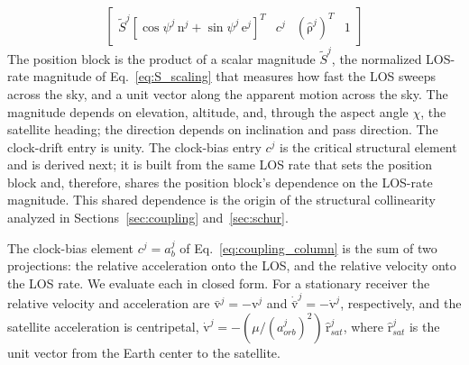 \documentclass[letterpaper,times]{IONconf-v2}
\theoremstyle{plain}
\theoremstyle{remark}
\renewcommand{\vec}[1]{{\boldsymbol{\mathrm{#1}}}}
\begin{document}
%
\begin{equation}\label{eq:8state_row}
\begin{bmatrix}
\tilde{S}^j\left[\cos\psi^j\,\vec{n}^j + \sin\psi^j\,\vec{e}^j\right]^T &
c^j &
(\hat{\vec\rho}^j)^T &
1
\end{bmatrix}
\end{equation}
%
The position block is the product of a scalar magnitude $\tilde{S}^j$, the normalized LOS-rate magnitude of Eq.~\eqref{eq:S_scaling} that measures how fast the LOS sweeps across the sky, and a unit vector along the apparent motion across the sky. The magnitude depends on elevation, altitude, and, through the aspect angle $\chi$, the satellite heading; the direction depends on inclination and pass direction. The clock-drift entry is unity. The clock-bias entry $c^j$ is the critical structural element and is derived next; it is built from the same LOS rate that sets the position block and, therefore, shares the position block's dependence on the LOS-rate magnitude. This shared dependence is the origin of the structural collinearity analyzed in Sections~\ref{sec:coupling} and~\ref{sec:schur}.

The clock-bias element $c^j = a_b^j$ of Eq.~\eqref{eq:coupling_column} is the sum of two projections: the relative acceleration onto the LOS, and the relative velocity onto the LOS rate. We evaluate each in closed form. For a stationary receiver the relative velocity and acceleration are $\bar{\vec v}^j = -\vec v^j$ and $\dot{\bar{\vec v}}^j = -\dot{\vec v}^j$, respectively, and the satellite acceleration is centripetal, $\dot{\vec v}^j = -(\mu/(a_{orb}^j)^2)\,\hat{\vec r}_{sat}^j$, where $\hat{\vec r}_{sat}^j$ is the unit vector from the Earth center to the satellite.

\vspace{-10pt}
\end{document}
